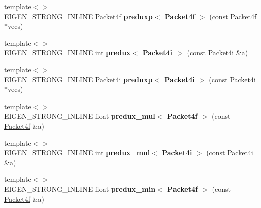 \begin{DoxyCompactItemize}
\item 
\mbox{\label{namespace_eigen_1_1internal_a39cf655faeabd9cf2fa3eecdf8f9a870}} 
{\footnotesize template$<$$>$ }\\E\+I\+G\+E\+N\+\_\+\+S\+T\+R\+O\+N\+G\+\_\+\+I\+N\+L\+I\+NE \hyperlink{struct_eigen_1_1internal_1_1_packet4f}{Packet4f} {\bfseries preduxp$<$ Packet4f $>$} (const \hyperlink{struct_eigen_1_1internal_1_1_packet4f}{Packet4f} $\ast$vecs)
\item 
\mbox{\label{namespace_eigen_1_1internal_acc5aba715ef7d93e46eb55406725ff24}} 
{\footnotesize template$<$$>$ }\\E\+I\+G\+E\+N\+\_\+\+S\+T\+R\+O\+N\+G\+\_\+\+I\+N\+L\+I\+NE int {\bfseries predux$<$ Packet4i $>$} (const Packet4i \&a)
\item 
\mbox{\label{namespace_eigen_1_1internal_afe316a337f5fa28c1bd4683c70d1dfe6}} 
{\footnotesize template$<$$>$ }\\E\+I\+G\+E\+N\+\_\+\+S\+T\+R\+O\+N\+G\+\_\+\+I\+N\+L\+I\+NE Packet4i {\bfseries preduxp$<$ Packet4i $>$} (const Packet4i $\ast$vecs)
\item 
\mbox{\label{namespace_eigen_1_1internal_a7ff699d76ee5c82f775f7521476cd738}} 
{\footnotesize template$<$$>$ }\\E\+I\+G\+E\+N\+\_\+\+S\+T\+R\+O\+N\+G\+\_\+\+I\+N\+L\+I\+NE float {\bfseries predux\+\_\+mul$<$ Packet4f $>$} (const \hyperlink{struct_eigen_1_1internal_1_1_packet4f}{Packet4f} \&a)
\item 
\mbox{\label{namespace_eigen_1_1internal_a64a70aad7e3c4cd7cd745f1cab35632b}} 
{\footnotesize template$<$$>$ }\\E\+I\+G\+E\+N\+\_\+\+S\+T\+R\+O\+N\+G\+\_\+\+I\+N\+L\+I\+NE int {\bfseries predux\+\_\+mul$<$ Packet4i $>$} (const Packet4i \&a)
\item 
\mbox{\label{namespace_eigen_1_1internal_afd762b5442ff0b187fa8754c6b0b45c2}} 
{\footnotesize template$<$$>$ }\\E\+I\+G\+E\+N\+\_\+\+S\+T\+R\+O\+N\+G\+\_\+\+I\+N\+L\+I\+NE float {\bfseries predux\+\_\+min$<$ Packet4f $>$} (const \hyperlink{struct_eigen_1_1internal_1_1_packet4f}{Packet4f} \&a)

\end{DoxyCompactItemize}
